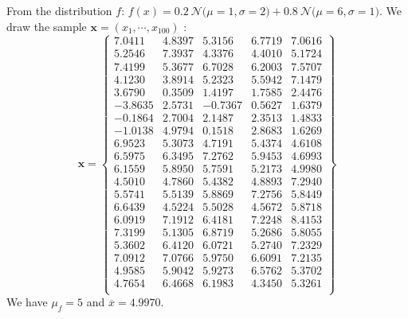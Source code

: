 From the distribution  $f$: $f(x)=0.2\ \mathcal{N}(\scriptstyle \mu=1,\sigma=2 \displaystyle) +0.8\  \mathcal{N}( \scriptstyle\mu=6,\sigma=1 \displaystyle)
$. We draw the sample  $\mathbf{x}=(x_1,\cdots,x_{100})$ :
\tiny
$$
\mathbf{x}=
\left\lbrace
\begin{array}{ccccc}
   7.0411 &  4.8397 &  5.3156 &  6.7719 &  7.0616 \\
    5.2546 &   7.3937 &  4.3376 &   4.4010&    5.1724\\
    7.4199 &   5.3677 &  6.7028 &   6.2003 &   7.5707\\
    4.1230 &   3.8914 &   5.2323 &  5.5942 &    7.1479\\
  3.6790 &     0.3509 &   1.4197&   1.7585 &   2.4476\\
   -3.8635 &   2.5731 &   -0.7367 &  0.5627 &   1.6379\\
   -0.1864 &   2.7004 &   2.1487 &  2.3513 &   1.4833\\
   -1.0138 &  4.9794 &  0.1518 &  2.8683 &  1.6269 \\
    6.9523 & 5.3073 &  4.7191 &   5.4374 &   4.6108 \\
    6.5975 &  6.3495 & 7.2762 &  5.9453 &   4.6993\\
    6.1559&  5.8950 &  5.7591 &  5.2173 &   4.9980\\
    4.5010 &  4.7860 &  5.4382 &   4.8893&  7.2940\\
    5.5741 &  5.5139 &  5.8869 &  7.2756 &   5.8449 \\
    6.6439 &  4.5224 &  5.5028 &  4.5672 &  5.8718 \\
    6.0919 &  7.1912 &  6.4181 &  7.2248 &  8.4153 \\
    7.3199 &  5.1305 &  6.8719 &  5.2686 &   5.8055 \\
    5.3602 &  6.4120 &  6.0721 &  5.2740 &  7.2329\\
    7.0912 &  7.0766 &  5.9750 &  6.6091 &  7.2135 \\
    4.9585 &  5.9042 &  5.9273 &  6.5762 &   5.3702\\
    4.7654 &  6.4668 &  6.1983 &  4.3450 &   5.3261\\
\end{array}\right\rbrace
$$
\normalsize
We have $\mu_f=5$ and $\overline{x}=4.9970$.
